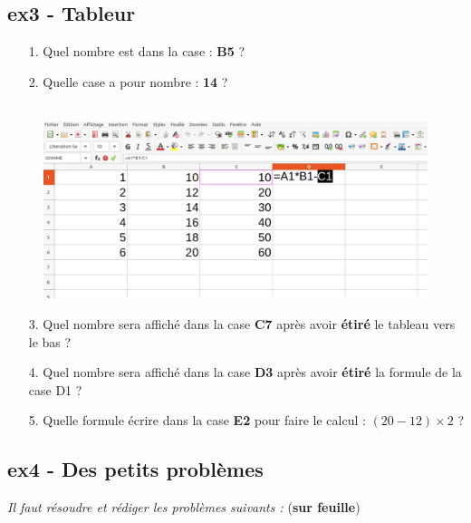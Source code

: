 \documentclass[11pt]{article}
\begin{document}
\begin{minipage}[t]{0.45\textwidth}
  \subsection*{ex3 - Tableur}

  \begin{enumerate}
    \item[1.] Quel nombre est dans la case : \textbf{B5} ? \dotfill
    \item[2.] Quelle case a pour nombre : \textbf{14} ? \dotfill
  \end{enumerate}

\end{minipage}
\begin{minipage}[t]{0.5\textwidth}

  \begin{figure}[H]
        \centering
        \includegraphics[width=\linewidth]{4x2-proportionnalite/ie-tableur.png}
  \end{figure}

\end{minipage}

\begin{enumerate}
  \item[3.] Quel nombre sera affiché dans la case \textbf{C7} après avoir \textbf{étiré} le tableau vers le bas ? \dotfill
  \item[4.] Quel nombre sera affiché dans la case \textbf{D3} après avoir \textbf{étiré} la formule de la case D1 ? \dotfill
  \item[5.] Quelle formule écrire dans la case \textbf{E2} pour faire le calcul : $(20-12) \times 2$ ? \dotfill
\end{enumerate}

\newpage

\subsection*{ex4 - Des petits problèmes}
\textit{Il faut résoudre et rédiger les problèmes suivants :} (\textbf{sur feuille})
\end{document}
